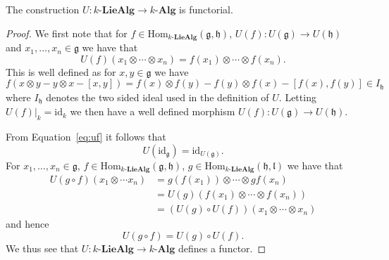 \begin{lemma}
  \label{lem:ufunct}
  The construction $ U:k\text{-}\mathbf{LieAlg} \to k\text{-}\mathbf{Alg} $ is functorial.
\end{lemma}
\begin{proof}
  We first note that for $ f \in \text{Hom}_{k\text{-}\mathbf{LieAlg}}(\mathfrak{g}, \mathfrak{h}) $, $ U(f): U(\mathfrak{g}) \to U(\mathfrak{h}) $ and $ x_1, \ldots, x_n \in \mathfrak{g} $ we have that
  \begin{equation}
    U(f)(x_1 \otimes \cdots \otimes x_n) = f(x_1) \otimes \cdots \otimes f(x_n).
    \label{eq:uf}
  \end{equation}
  This is well defined as for $ x,y \in \mathfrak{g} $ we have
  \begin{equation*}
    f(x \otimes y - y \otimes x - [x,y]) = f(x) \otimes f(y) - f(y) \otimes f(x) - [f(x), f(y)] \in I_{\mathfrak{h}}
  \end{equation*}
  where $ I_{\mathfrak{h}} $ denotes the two sided ideal used in the definition of $ U $. Letting $ U(f)|_k = \text{id}_k $ we then have a well defined morphism $ U(f):U(\mathfrak{g}) \to U(\mathfrak{h}) $.

  From Equation~\ref{eq:uf} it follows that
  \begin{equation*}
    U(\text{id}_{\mathfrak{g}}) = \text{id}_{U(\mathfrak{g})}.
  \end{equation*}
  For $ x_1, \ldots, x_n \in \mathfrak{g} $, $ f \in \text{Hom}_{k\text{-}\mathbf{LieAlg}}(\mathfrak{g}, \mathfrak{h})  $, $  g \in \text{Hom}_{k\text{-}\mathbf{LieAlg}}(\mathfrak{h}, \mathfrak{l})  $ we have that
  \begin{align*}
    U(g \circ f)(x_1 \otimes \cdots x_n) &= g(f(x_1)) \otimes \cdots \otimes gf(x_n) \\
                                         &= U(g)(f(x_1) \otimes \cdots \otimes f(x_n)) \\
                                         &= (U(g) \circ U(f))(x_1 \otimes \cdots \otimes x_n)
  \end{align*}
  and hence
  \begin{equation}
    U(g \circ f) = U(g) \circ U(f)
  .\end{equation}
  We thus see that $ U:k\text{-}\mathbf{LieAlg} \to k\text{-}\mathbf{Alg} $ defines a functor.
\end{proof}


